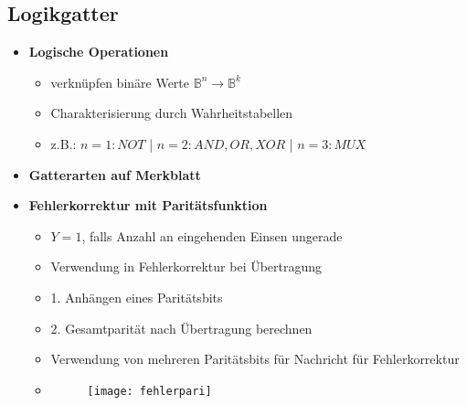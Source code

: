 \subsection{Logikgatter}
\begin{itemize}

\item \textbf{Logische Operationen}
	\begin{itemize}
	\item verknüpfen binäre Werte $\mathbb{B}^n \rightarrow \mathbb{B}^k$
	\item Charakterisierung durch Wahrheitstabellen
	\item z.B.: $n = 1: NOT$ | $n = 2: AND, OR,XOR$ | $n = 3: MUX$
	\end{itemize}

\item \textbf{Gatterarten auf Merkblatt}

\item \textbf{Fehlerkorrektur mit Paritätsfunktion}
	\begin{itemize}
	\item $Y = 1$, falls Anzahl an eingehenden Einsen ungerade
	\item Verwendung in Fehlerkorrektur bei Übertragung
	\item 1. Anhängen eines Paritätsbits 
	\item 2. Gesamtparität nach Übertragung berechnen
	\item Verwendung von mehreren Paritätsbits für Nachricht für Fehlerkorrektur
	\item[] 	
		\begin{figure}[H]
		\begin{center}
		\texttt{[image: fehlerpari]}
		\end{center}
		\end{figure}
	\end{itemize}

\end{itemize}

\pagebreak

